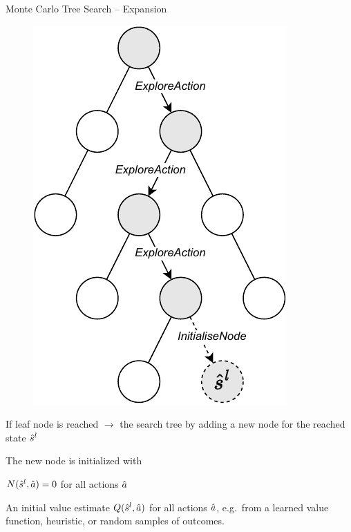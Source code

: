\begin{frame}[t]{Monte Carlo Tree Search -- Expansion}
    \begin{minipage}{0.39\textwidth}
        \begin{figure}
            \centering
            \includegraphics[width=.8\textwidth]{images/chapter_9/mcts-expand}
        \end{figure}
    \end{minipage}
    \hfill
    \begin{minipage}{0.59\textwidth}
        If leaf node is reached $\rightarrow$  the search tree by adding a new node for the reached state $\hat{s}^l$\\

        \pause

        The new node is initialized with
        \blist
            \item $N(\hat{s}^l, \hat{a}) = 0$ for all actions $\hat{a}$
            \item An initial value estimate $Q(\hat{s}^l, \hat{a})$ for all actions $\hat{a}$, e.g.\ from a learned value function, heuristic, or random samples of outcomes.
        \elist
    \end{minipage}
\end{frame}

